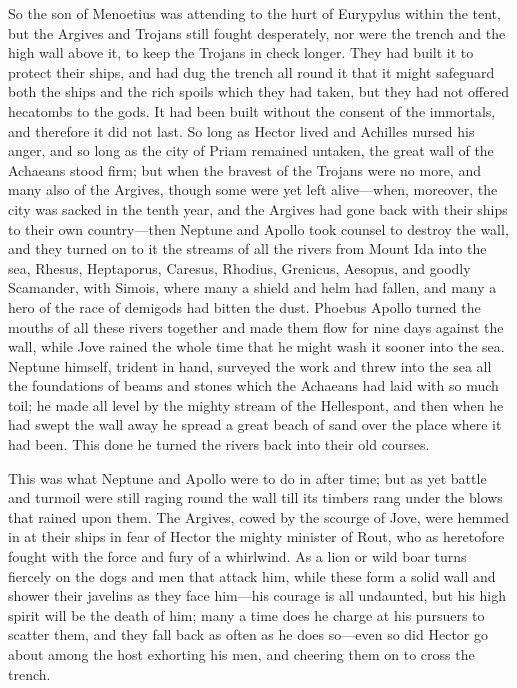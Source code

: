 So the son of Menoetius was attending to the hurt of Eurypylus within the
tent, but the Argives and Trojans still fought desperately, nor were the
trench and the high wall above it, to keep the Trojans in check longer.
They had built it to protect their ships, and had dug the trench all round
it that it might safeguard both the ships and the rich spoils which they
had taken, but they had not offered hecatombs to the gods. It had been
built without the consent of the immortals, and therefore it did not last.
So long as Hector lived and Achilles nursed his anger, and so long as the
city of Priam remained untaken, the great wall of the Achaeans stood firm;
but when the bravest of the Trojans were no more, and many also of the
Argives, though some were yet left alive—when, moreover, the city
was sacked in the tenth year, and the Argives had gone back with their
ships to their own country—then Neptune and Apollo took counsel to
destroy the wall, and they turned on to it the streams of all the rivers
from Mount Ida into the sea, Rhesus, Heptaporus, Caresus, Rhodius,
Grenicus, Aesopus, and goodly Scamander, with Simois, where many a shield
and helm had fallen, and many a hero of the race of demigods had bitten
the dust. Phoebus Apollo turned the mouths of all these rivers together
and made them flow for nine days against the wall, while Jove rained the
whole time that he might wash it sooner into the sea. Neptune himself,
trident in hand, surveyed the work and threw into the sea all the
foundations of beams and stones which the Achaeans had laid with so much
toil; he made all level by the mighty stream of the Hellespont, and then
when he had swept the wall away he spread a great beach of sand over the
place where it had been. This done he turned the rivers back into their
old courses.

This was what Neptune and Apollo were to do in after time; but as yet
battle and turmoil were still raging round the wall till its timbers rang
under the blows that rained upon them. The Argives, cowed by the scourge
of Jove, were hemmed in at their ships in fear of Hector the mighty
minister of Rout, who as heretofore fought with the force and fury of a
whirlwind. As a lion or wild boar turns fiercely on the dogs and men that
attack him, while these form a solid wall and shower their javelins as
they face him—his courage is all undaunted, but his high spirit will
be the death of him; many a time does he charge at his pursuers to scatter
them, and they fall back as often as he does so—even so did Hector
go about among the host exhorting his men, and cheering them on to cross
the trench.

